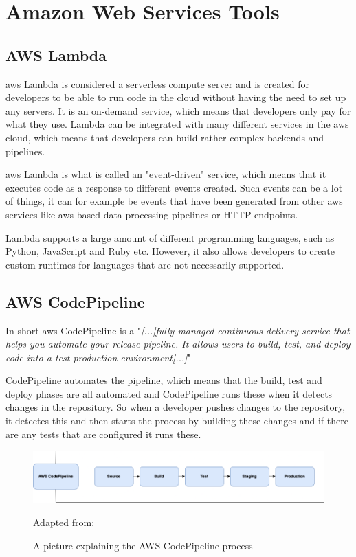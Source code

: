 \section{Amazon Web Services Tools}
\subsection{AWS Lambda}
\acrshort{aws} Lambda is considered a serverless compute server and is created for developers to be able to run code in the cloud without having the need to set up any servers. It is an on-demand service, which means that developers only pay for what they use. Lambda can be integrated with many different services in the \acrshort{aws} cloud, which means that developers can build rather complex backends and pipelines. 

\acrshort{aws} Lambda is what is called an "event-driven" service, which means that it executes code as a response to different events created. Such events can be a lot of things, it can for example be events that have been generated from other \acrshort{aws} services like \acrshort{aws} based data processing pipelines or HTTP endpoints. 

Lambda supports a large amount of different programming languages, such as Python, JavaScript and Ruby etc. However, it also allows developers to create custom runtimes for languages that are not necessarily supported. \cite{AWSLamda}



\subsection{AWS CodePipeline}
In short \acrshort{aws} CodePipeline is a "\textit{[...]fully managed continuous delivery service that helps you automate your release pipeline. It allows users to build, test, and deploy code into a test production environment[...]}"
\cite{AWSCodePipeline}

CodePipeline automates the pipeline, which means that the build, test and deploy phases are all automated and CodePipeline runs these when it detects changes in the repository. So when a developer pushes changes to the repository, it detectes this and then starts the process by building these changes and if there are any tests that are configured it runs these. \cite{AWSCodePipeline1}
\begin{figure}[htp]
    \centering
    \includegraphics[width=1\columnwidth]{Images/CodePipeline.png}
    \caption{A picture explaining the AWS CodePipeline process}Adapted from: \cite{AWSCodePipeline2}
    \label{fig:my_label}
\end{figure}

